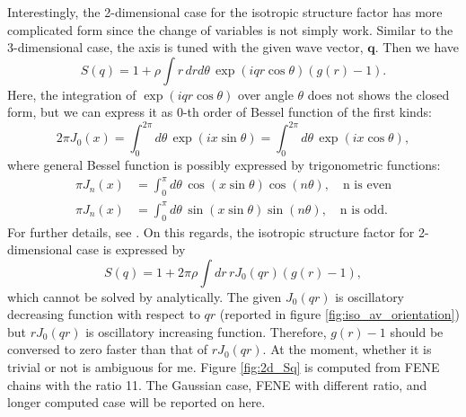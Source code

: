 \documentclass[10pt, a4paper]{report}
\begin{document}
\begin{appendices}
    Interestingly, the 2-dimensional case for the isotropic structure factor has more complicated form since the change of variables is not simply work. Similar to the 3-dimensional case, the axis is tuned with the given wave vector, $\mathbf{q}$. Then we have
    \begin{equation}
      S(q) = 1 + \rho \int r\,drd\theta\, \exp(iqr \cos\theta)(g(r) - 1).
    \end{equation}
    Here, the integration of $\exp(iqr \cos\theta)$ over angle $\theta$ does not shows the closed form, but we can express it as 0-th order of Bessel function of the first kinds:
    \begin{equation}
      2\pi J_0(x) = \int_{0}^{2\pi}d\theta\, \exp(ix\sin\theta) = \int_{0}^{2\pi}d\theta\, \exp(ix\cos\theta),
    \end{equation}
    where general Bessel function is possibly expressed by trigonometric functions:
    \begin{align}
      \pi J_n(x) &= \int_0^{\pi}d\theta\,\cos(x\sin\theta)\cos (n\theta) , \quad\textrm{n is even} \\
      \pi J_n(x) &= \int_0^{\pi}d\theta\,\sin(x \sin\theta)\sin (n\theta) , \quad\textrm{n is odd}.
    \end{align}
    For further details, see \textcite{arfken2008mathematical}.
    On this regards, the isotropic structure factor for 2-dimensional case is expressed by
    \begin{equation}
      S(q) = 1 + 2\pi \rho \int dr \,r J_0(qr) (g(r) - 1),
    \end{equation}
    which cannot be solved by analytically. 
    The given $J_0(qr)$ is oscillatory decreasing function with respect to $qr$ (reported in figure \ref{fig:iso_av_orientation}) but $rJ_0(qr)$ is oscillatory increasing function. Therefore, $g(r)-1$ should be conversed to zero faster than that of $rJ_0(qr)$. At the moment, whether it is trivial or not is ambiguous for me.
    Figure \ref{fig:2d_Sq} is computed from FENE chains with the ratio 11. The Gaussian case, FENE with different ratio, and longer computed case will be reported on here.


\end{appendices}
\end{document}
